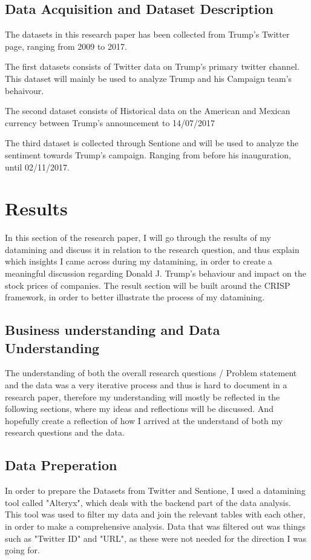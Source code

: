 \documentclass{article}
\begin{document}
\subsection{Data Acquisition and Dataset Description}
The datasets in this research paper has been collected from Trump's Twitter page, ranging from 2009 to 2017.

The first datasets consists of Twitter data on Trump's primary twitter channel.  This dataset will mainly be used to analyze Trump and his Campaign team's behaivour. 

The second dataset consists of Historical data on the American and Mexican currency between Trump's announcement to  14/07/2017

The third dataset is collected through Sentione and will be used to analyze the sentiment towards Trump's campaign. Ranging from before his inauguration, until 02/11/2017. 

\cleardoublepage


\section{Results}
In this section of the research paper, I will go through the results of my datamining and discuss it in relation to the research question, and thus explain which insights I came across during my datamining, in order to create a meaningful discussion regarding Donald J. Trump's behaviour and impact on the stock prices of companies. The result section will be built around the CRISP framework, in order to better illustrate the process of my datamining.

\subsection{Business understanding and Data Understanding}
The understanding of both the overall research questions / Problem statement and the data was a very iterative process and thus is hard to document in a research paper, therefore my understanding will mostly be reflected in the following sections, where my ideas and reflections will be discussed.  And hopefully create a reflection of how I arrived at the understand of both my research questions and the data.

\subsection{Data Preperation}
In order to prepare the Datasets from Twitter and Sentione, I used a datamining tool called "Alteryx", which deals with the backend part of the data analysis. This tool was used to filter my data and join the relevant tables with each other, in order to make a comprehensive analysis. Data that was filtered out was things such as "Twitter ID" and "URL", as these were not needed for the direction I was going for. 
\end{document}

